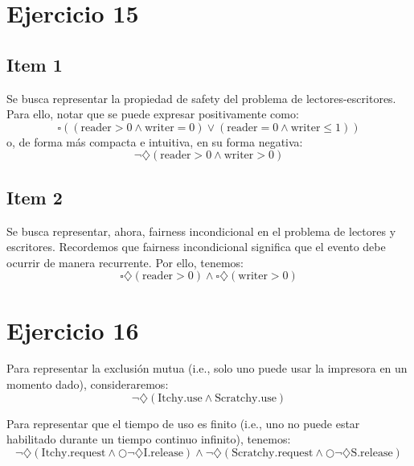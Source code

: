 \documentclass{article}
\begin{document}
\section*{Ejercicio 15}

\subsection*{Item 1}
Se busca representar la propiedad de safety del problema de lectores-escritores.
Para ello, notar que se puede expresar positivamente como:
\begin{equation*}
	\square((\text{reader} > 0 \land \text{writer} = 0) \lor (\text{reader} = 0 \land \text{writer} \leq 1))
\end{equation*}
o, de forma más compacta e intuitiva, en su forma negativa:
\begin{equation*}
	\neg\diamondsuit(\text{reader} > 0 \land \text{writer} > 0)
\end{equation*}

\subsection*{Item 2}
Se busca representar, ahora, fairness incondicional en el problema de lectores y escritores.
Recordemos que fairness incondicional significa que el evento debe ocurrir de manera recurrente.
Por ello, tenemos:
\begin{equation*}
	\square\diamondsuit(\text{reader} > 0) \land \square\diamondsuit(\text{writer} > 0)
\end{equation*}

\section*{Ejercicio 16}
Para representar la exclusión mutua (i.e., solo uno puede usar la impresora en un momento dado), consideraremos:
\begin{equation*}
	\neg\diamondsuit(\text{Itchy.use} \land \text{Scratchy.use})
\end{equation*}

Para representar que el tiempo de uso es finito (i.e., uno no puede estar habilitado durante un tiempo continuo infinito), tenemos:
\begin{equation*}
	\neg \diamondsuit (\text{Itchy.request} \land \bigcirc \neg \diamondsuit \text{I.release}) \land \neg \diamondsuit (\text{Scratchy.request} \land \bigcirc \neg \diamondsuit \text{S.release})
\end{equation*}
\end{document}
